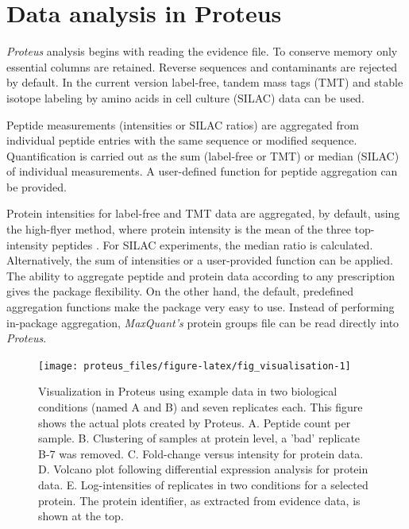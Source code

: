 \documentclass[]{article}
\begin{document}
\section{Data analysis in Proteus}\label{data-analysis-in-proteus}

\emph{Proteus} analysis begins with reading the evidence file. To
conserve memory only essential columns are retained. Reverse sequences
and contaminants are rejected by default. In the current version
label-free, tandem mass tags (TMT) \citep{thompson2003} and stable
isotope labeling by amino acids in cell culture (SILAC) \citep{ong2002}
data can be used.

Peptide measurements (intensities or SILAC ratios) are aggregated from
individual peptide entries with the same sequence or modified sequence.
Quantification is carried out as the sum (label-free or TMT) or median
(SILAC) of individual measurements. A user-defined function for peptide
aggregation can be provided.

Protein intensities for label-free and TMT data are aggregated, by
default, using the high-flyer method, where protein intensity is the
mean of the three top-intensity peptides \citep{silva2006}. For SILAC
experiments, the median ratio is calculated. Alternatively, the sum of
intensities or a user-provided function can be applied. The ability to
aggregate peptide and protein data according to any prescription gives
the package flexibility. On the other hand, the default, predefined
aggregation functions make the package very easy to use. Instead of
performing in-package aggregation, \emph{MaxQuant's} protein groups file
can be read directly into \emph{Proteus}.

\begin{figure}[H]

{\centering \texttt{[image: proteus\_files/figure-latex/fig\_visualisation-1]} 

}

\caption{\label{fig:visualisation}Visualization in Proteus using example data in two biological conditions (named A and B) and seven replicates each. This figure shows the actual plots created by Proteus. A. Peptide count per sample. B. Clustering of samples at protein level, a 'bad' replicate B-7 was removed. C. Fold-change versus intensity for protein data. D. Volcano plot following differential expression analysis for protein data. E. Log-intensities of replicates in two conditions for a selected protein. The protein identifier, as extracted from evidence data, is shown at the top.}\label{fig:fig_visualisation}
\end{figure}
\end{document}
